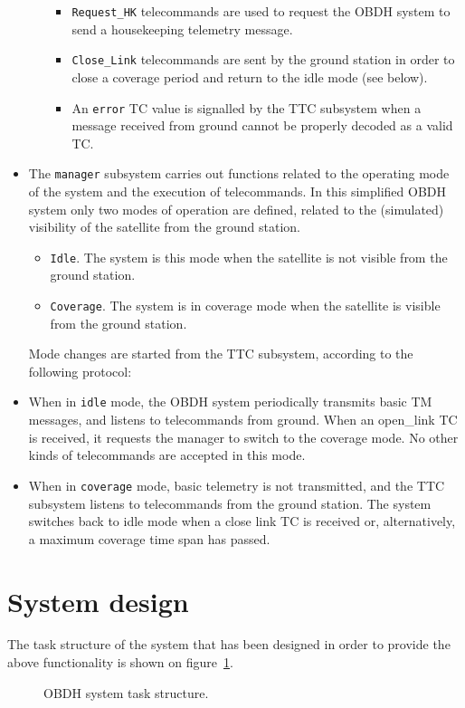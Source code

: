 \begin{itemize}
\begin{itemize}
\begin{itemize}
\item {\tt Request\_HK} telecommands are used to request the OBDH system to send a housekeeping telemetry message.
\item {\tt Close\_Link} telecommands are sent by the ground station in order to close a coverage period and return to the idle mode (see below).
\item An {\tt error} TC value is signalled by the TTC subsystem when a message received from ground cannot be properly decoded as a valid TC.
\end{itemize}
\end{itemize}
\item The {\tt manager} subsystem carries out functions related to the operating mode of the system and the execution of telecommands. In this simplified OBDH system only two modes of operation are defined, related to the (simulated) visibility of the satellite from the ground station.
\begin{itemize}
\item {\tt Idle}. The system is this mode when the satellite is not visible from the ground station.
\item {\tt Coverage}. The system is in coverage mode when the satellite is visible from the ground station.
\end{itemize}
Mode changes are started from the TTC subsystem, according to the following protocol:
\item When in {\tt idle} mode, the OBDH system periodically transmits basic TM messages, and listens to telecommands from ground. When an open\_link TC is received, it requests the manager to switch to the coverage mode. No other kinds of telecommands are accepted in this mode.
\item When in {\tt coverage} mode, basic telemetry is not transmitted, and the TTC subsystem listens to telecommands from the ground station. The system switches back to idle mode when a close link TC is received or, alternatively, a maximum coverage time span has passed.
\end{itemize}

\section{System design}
The task structure of the system that has been designed in order to provide the above functionality is shown on figure~\ref{fig:obdh-task}.
\begin{figure}[h]
            \caption{OBDH system task structure.}
            \label{fig:obdh-task}
\end{figure}

